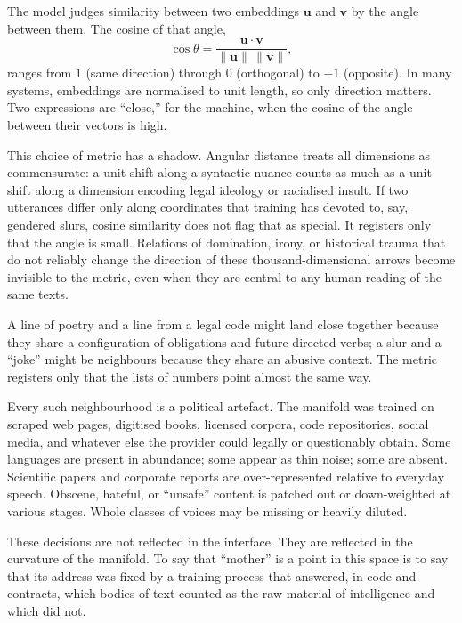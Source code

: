 \documentclass[12pt,a4paper]{article}
\begin{document}
\begin{formalbox}[title={Alignment as angle}]
The model judges similarity between two embeddings $\mathbf{u}$ and $\mathbf{v}$ by the angle between them. The cosine of that angle,
\[
\cos\theta = \frac{\mathbf{u}\cdot\mathbf{v}}{\|\mathbf{u}\|\,\|\mathbf{v}\|},
\]
ranges from $1$ (same direction) through $0$ (orthogonal) to $-1$ (opposite). In many systems, embeddings are normalised to unit length, so only direction matters. Two expressions are ``close,'' for the machine, when the cosine of the angle between their vectors is high.

This choice of metric has a shadow. Angular distance treats all dimensions as commensurate: a unit shift along a syntactic nuance counts as much as a unit shift along a dimension encoding legal ideology or racialised insult. If two utterances differ only along coordinates that training has devoted to, say, gendered slurs, cosine similarity does not flag that as special. It registers only that the angle is small. Relations of domination, irony, or historical trauma that do not reliably change the direction of these thousand-dimensional arrows become invisible to the metric, even when they are central to any human reading of the same texts.
\end{formalbox}

A line of poetry and a line from a legal code might land close together because they share a configuration of obligations and future-directed verbs; a slur and a ``joke'' might be neighbours because they share an abusive context. The metric registers only that the lists of numbers point almost the same way.

Every such neighbourhood is a political artefact. The manifold was trained on scraped web pages, digitised books, licensed corpora, code repositories, social media, and whatever else the provider could legally or questionably obtain. Some languages are present in abundance; some appear as thin noise; some are absent. Scientific papers and corporate reports are over-represented relative to everyday speech. Obscene, hateful, or ``unsafe'' content is patched out or down-weighted at various stages. Whole classes of voices may be missing or heavily diluted.

These decisions are not reflected in the interface. They are reflected in the curvature of the manifold. To say that ``mother'' is a point in this space is to say that its address was fixed by a training process that answered, in code and contracts, which bodies of text counted as the raw material of intelligence and which did not.
\end{document}
